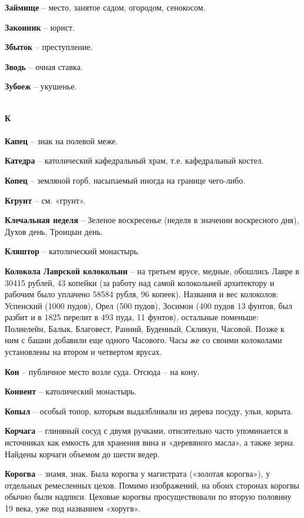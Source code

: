 \begin{multicols}{2}
\textbf{Займище} – место, занятое садом, огородом, сенокосом.

\textbf{Законник} – юрист.

\textbf{Збыток} – преступление.

\textbf{Зводь} – очная ставка.

\textbf{Зубоеж} – укушенье.

\mbox{ }\\
\textbf{К\\}
\mbox{ }\\

\textbf{Капец} – знак на полевой меже.

\textbf{Катедра} – католический кафедральный храм, т.е. кафедральный костел.

\textbf{Копец} – земляной горб, насыпаемый иногда на границе чего-либо.

\textbf{Кгрунт} – см. «грунт».

\textbf{Клечальная неделя} – Зеленое воскресенье (неделя в значении воскресного дня), Духов день, Троицын день.

\textbf{Кляштор} – католический монастырь.

\textbf{Колокола Лаврской колокольни} – на третьем ярусе, медные, обошлись Лавре в 30415 рублей, 43 копейки (за работу над самой колокольней архитектору и рабочим было уплачено 58584 рубля, 96 копеек). Названия и вес колоколов: Успенский (1000 пудов), Орел (500 пудов), Зосимон (400 пудов 13 фунтов, был разбит и в 1825 перелит в 493 пуда, 11 фунтов), остальные поменьше: Полиелейн, Балык, Благовест, Ранний, Буденный, Скликун, Часовой. Позже к ним с башни добавили еще одного Часового. Часы же со своими колоколами установлены на втором и четвертом ярусах.


\textbf{Кон} – публичное место возле суда. Отсюда – на кону.

\textbf{Конвент} – католический монастырь.

\textbf{Копыл} – особый топор, которым выдалбливали из дерева посуду, ульи, корыта.

\textbf{Корчага} – глиняный сосуд с двумя ручками, отнсительно часто упоминается в источниках как емкость для хранения вина и «деревяного масла», а также зерна. Найдены корчаги объемом до шести ведер.

\textbf{Корогва} – знамя, знак. Была корогва у магистрата («золотая корогва»), у отдельных ремесленных цехов. Помимо изображений, на обоих сторонах корогвы обычно были надписи. Цеховые корогвы просуществовали по вторую половину 19 века, уже под названием «хоругв».


\end{multicols}
